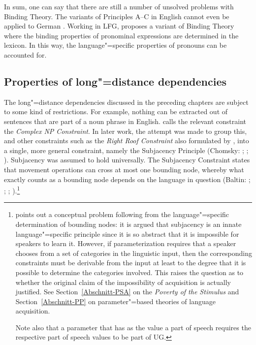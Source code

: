 In sum, one can say that there are still a number of unsolved problems with Binding Theory. The
\hpsg variants of Principles A--C in English cannot
even be applied to German \citep[Chapter~20]{Mueller99a}. Working in LFG, \citet{Dalrymple93a} proposes a variant of Binding Theory where the binding
properties of pronominal expressions are determined in the lexicon. In this way, the language"=specific properties of pronouns can be accounted for.

\subsection{Properties of long"=distance dependencies}
\label{Abschnitt-Fernabhängigkeiten}

The 
long"=distance dependencies discussed in the preceding chapters are subject
to some kind of restrictions. For example, nothing can be extracted out of sentences that are part of a noun phrase in English. \citet[]{Ross67} calls the relevant constraint the \emph{Complex NP Constraint}. In later work, the attempt was made to group this, and other constraints such as the
\emph{Right Roof Constraint} also formulated by  \citet[Section~5.1.2]{Ross67}, into a single, more general constraint, namely the Subjacency Principle
	(Chomsky: \citeyear[]{Chomsky73a}; \citeyear[]{Chomsky86b}; \citealp{Baltin81a,Baltin2006a}).
Subjacency was assumed to hold universally.
The Subjacency Constraint states that movement operations can cross at most one bounding node, whereby what exactly counts as a bounding node
depends on the language in question (Baltin: \citeyear[]{Baltin81a};
\citeyear{Baltin2006a}; \citealp[]{Rizzi82b}; \citealp[--40]{Chomsky86b}).\footnote{
	 \citet[--540]{Newmeyer2004a} points out a conceptual problem following from the language"=specific determination of bounding nodes: it is argued
	 that subjacency is an innate language"=specific principle since it is so abstract that it is impossible for speakers to learn it. However, if parameterization
	 requires that a speaker chooses from  a set of categories in the linguistic input, then the corresponding constraints must be derivable from the input at least to
	 the degree that it is possible to determine the categories involved. This raises the question as to whether the original claim of the impossibility of acquisition
	 is actually justified. See Section~\ref{Abschnitt-PSA} on the  \emph{Poverty of the Stimulus}
	 and Section~\ref{Abschnitt-PP} on parameter"=based theories of language
         acquisition.

         Note also that a parameter that has as the value a part of speech requires the respective
         part of speech values to be part of UG.
}

